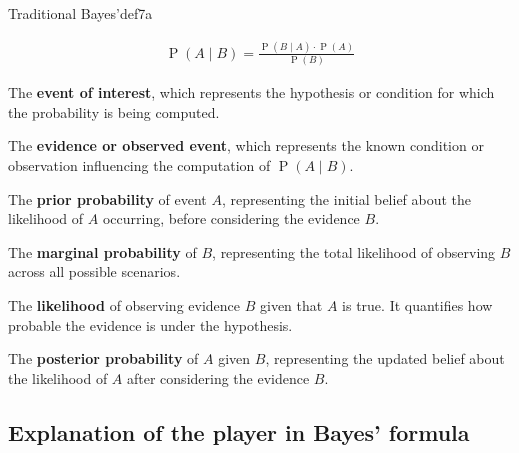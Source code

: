 \documentclass[
  12 pt,
  a4paper,
]{book}
\numberwithin{equation}{section}
\theoremstyle{plain}      %
\theoremstyle{definition} %
\theoremstyle{remark}     %
\theoremstyle{note}         %
\begin{document}
\begin{a_def}{Traditional Bayes'}{def7a} 

\begin{align}
\operatorname{P}(A\! \mid\! B)=\frac{\operatorname{P}(B\! \mid\! A) \cdot \operatorname{P}(A)}{\operatorname{P}(B)}
\end{align}


\begin{description}[align=left, labelwidth=2.5cm, labelsep=0em, leftmargin=2.5cm] 
    \item[$A$] The \textbf{event of interest}, which represents the hypothesis or condition for which the probability is being computed.
    \vspace{0.5\baselineskip}
    \item[$B$] The \textbf{evidence or observed event}, which represents the known condition or observation influencing the computation of \( \operatorname{P}(A \mid B) \).
    \vspace{0.5\baselineskip}
    \item[$\operatorname{P}(A)$] The \textbf{prior probability} of event \( A \), representing the initial belief about the likelihood of \( A \) occurring, before considering the evidence \( B \).
    \vspace{0.5\baselineskip}
    \item[$\operatorname{P}(B)$] The \textbf{marginal probability} of \( B \), representing the total likelihood of observing \( B \) across all possible scenarios.
    \vspace{0.5\baselineskip}
    \item[$\operatorname{P}(B \mid A)$] The \textbf{likelihood} of observing evidence \( B \) given that \( A \) is true. It quantifies how probable the evidence is under the hypothesis.
    \vspace{0.5\baselineskip}
    \item[$\operatorname{P}(A \mid B)$] The \textbf{posterior probability} of \( A \) given \( B \), representing the updated belief about the likelihood of \( A \) after considering the evidence \( B \).
\end{description}

\end{a_def}

\hfill\break

\newpage

\hypertarget{explanation-of-the-player-in-bayes-formula}{%
\subsection{Explanation of the player in Bayes'
formula}\label{explanation-of-the-player-in-bayes-formula}}
\end{document}
